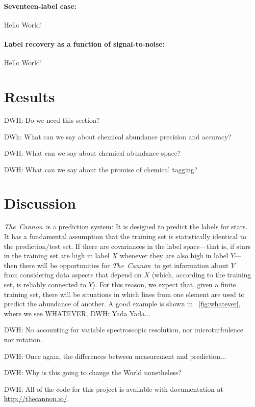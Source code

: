 \documentclass[12pt,preprint]{aastex}
\newcommand{\project}[1]{\textsl{#1}}
\newcommand{\TheCannon}{\project{The~Cannon}}
\begin{document}
\paragraph{Seventeen-label case:}
Hello World!

\paragraph{Label recovery as a function of signal-to-noise:}
Hello World!

\section{Results}

DWH: Do we need this section?

DWh: What can we say about chemical abundance precision and accuracy?

DWH: What can we say about chemical abundance space?

DWH: What can we say about the promise of chemical tagging?

\section{Discussion}


\TheCannon\ is a prediction system: It is designed to predict the
labels for stars.
It has a fundamental assumption that the training set is statistically
identical to the prediction/test set.
If there are covariances in the label space---that is, if stars in the
training set are high in label $X$ whenever they are also high in
label $Y$---then there will be opportunities for \TheCannon\ to get
information about $Y$ from considering data aspects that depend on
$X$ (which, according to the training set, is reliably connected to $Y$).
For this reason, we expect that, given a finite training set, there
will be situations in which lines from one element are used to predict
the abundance of another.
A good example is shown in \figurename~\ref{fig:whatever}, where we
see WHATEVER.
DWH: Yada Yada...


DWH: No accounting for variable spectroscopic resolution, nor
microturbulence nor rotation.

DWH:  Once again, the differences between measurement and prediction...

DWH:  Why is this going to change the World nonetheless?

DWH: All of the code for this project is available with documentation
at \url{http://thecannon.io/}.
\end{document}
